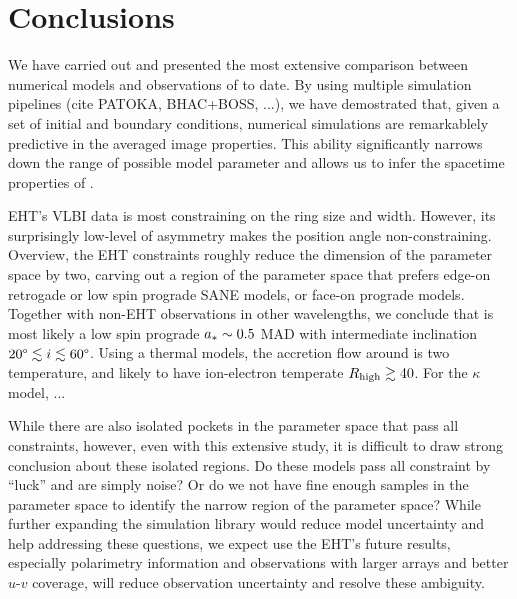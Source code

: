 \section{Conclusions}\label{sec:conclusions}


We have carried out and presented the most extensive comparison
between numerical models and observations of \sgra to date.
By using multiple simulation pipelines (cite PATOKA, BHAC+BOSS, ...),
we have demostrated that, given a set of initial and boundary
conditions, numerical simulations are remarkablely predictive in the
averaged image properties.
This ability significantly narrows down the range of possible model
parameter and allows us to infer the spacetime properties of \sgra.

EHT's VLBI data is most constraining on the ring size and width.
However, its surprisingly low-level of asymmetry makes the position
angle non-constraining.
Overview, the EHT constraints roughly reduce the dimension of the
parameter space by two, carving out a region of the parameter space
that prefers edge-on retrogade or low spin prograde SANE models, or
face-on prograde models.
Together with non-EHT observations in other wavelengths, we conclude
that \sgra is most likely a low spin prograde $a_* \sim 0.5$ MAD with
intermediate inclination $20\degree \lesssim i \lesssim 60\degree$.
Using a thermal models, the accretion flow around \sgra is two
temperature, and likely to have ion-electron temperate $R_\mathrm{high} \gtrsim
40$.
For the $\kappa$ model, ...

While there are also isolated pockets in the parameter space that pass
all constraints, however, even with this extensive study, it is
difficult to draw strong conclusion about these isolated regions.
Do these models pass all constraint by ``luck'' and are simply noise?
Or do we not have fine enough samples in the parameter space to
identify the narrow region of the parameter space?
While further expanding the simulation library would reduce model
uncertainty and help addressing these questions, we expect use the
EHT's future results, especially polarimetry information and
observations with larger arrays and better $u$-$v$ coverage, will
reduce observation uncertainty and resolve these ambiguity.

